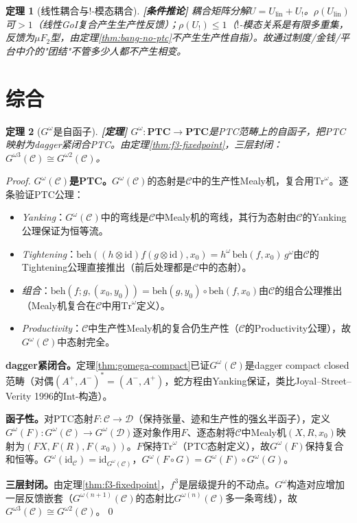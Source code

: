 \documentclass[11pt,a4paper]{article}
\newtheorem{theorem}{定理}
\newcommand{\lvl}[1]{\hfill\textbf{\footnotesize[#1]}}
\newcommand{\lvP}{\lvl{定理}}
\newcommand{\lvC}{\lvl{条件推论}}
\newcommand{\bang}{{!}}
\begin{document}
\begin{theorem}[线性耦合与$\bang$-模态耦合]\label{thm:coupling-quality}\lvC
耦合矩阵分解$U=U_{\mathrm{lin}}+U_{\bang}$。$\rho(U_{\mathrm{lin}})$可$>1$（线性GoI复合产生生产性反馈）；$\rho(U_{\bang})\leq 1$（$\bang$-模态关系是有限多重集，反馈为$\mu F_2$型，由定理\ref{thm:bang-no-ptc}不产生生产性自指）。故通过制度/金钱/平台中介的"团结"不管多少人都不产生相变。
\end{theorem}

\section{综合}

\begin{theorem}[$G^\omega$是自函子]\label{thm:gomega-endofunctor}\lvP
$G^\omega:\mathbf{PTC}\to\mathbf{PTC}$是PTC范畴上的自函子，把PTC映射为dagger紧闭合PTC。由定理\ref{thm:f3-fixedpoint}，三层封闭：$G^{\omega 3}(\mathcal{C})\cong G^{\omega 2}(\mathcal{C})$。
\end{theorem}

\begin{proof}
\textbf{$G^\omega(\mathcal{C})$是PTC。}$G^\omega(\mathcal{C})$的态射是$\mathcal{C}$中的生产性Mealy机，复合用$\mathrm{Tr}^\omega$。逐条验证PTC公理：
\begin{itemize}
  \item \emph{Yanking}：$G^\omega(\mathcal{C})$中的弯线是$\mathcal{C}$中Mealy机的弯线，其行为态射由$\mathcal{C}$的Yanking公理保证为恒等流。
  \item \emph{Tightening}：$\mathrm{beh}((h\otimes\mathrm{id})f(g\otimes\mathrm{id}),x_0)=h^\omega\,\mathrm{beh}(f,x_0)\,g^\omega$由$\mathcal{C}$的Tightening公理直接推出（前后处理都是$\mathcal{C}$中的态射）。
  \item \emph{组合}：$\mathrm{beh}(f;g,(x_0,y_0))=\mathrm{beh}(g,y_0)\circ\mathrm{beh}(f,x_0)$由$\mathcal{C}$的组合公理推出（Mealy机复合在$\mathcal{C}$中用$\mathrm{Tr}^\omega$定义）。
  \item \emph{Productivity}：$\mathcal{C}$中生产性Mealy机的复合仍生产性（$\mathcal{C}$的Productivity公理），故$G^\omega(\mathcal{C})$中态射完全。
\end{itemize}

\textbf{dagger紧闭合。}定理\ref{thm:gomega-compact}已证$G^\omega(\mathcal{C})$是dagger compact closed范畴（对偶$(A^+,A^-)^*=(A^-,A^+)$，蛇方程由Yanking保证，类比Joyal--Street--Verity 1996的Int-构造）。

\textbf{函子性。}对PTC态射$F:\mathcal{C}\to\mathcal{D}$（保持张量、迹和生产性的强幺半函子），定义$G^\omega(F):G^\omega(\mathcal{C})\to G^\omega(\mathcal{D})$逐对象作用$F$、逐态射将$\mathcal{C}$中Mealy机$(X,R,x_0)$映射为$(FX,F(R),F(x_0))$。$F$保持$\mathrm{Tr}^\omega$（PTC态射定义），故$G^\omega(F)$保持复合和恒等。$G^\omega(\mathrm{id}_\mathcal{C})=\mathrm{id}_{G^\omega(\mathcal{C})}$，$G^\omega(F\circ G)=G^\omega(F)\circ G^\omega(G)$。

\textbf{三层封闭。}由定理\ref{thm:f3-fixedpoint}，$f^3$是层级提升的不动点。$G^\omega$构造对应增加一层反馈嵌套（$G^{\omega(n+1)}(\mathcal{C})$的态射比$G^{\omega(n)}(\mathcal{C})$多一条弯线），故$G^{\omega 3}(\mathcal{C})\cong G^{\omega 2}(\mathcal{C})$。\qed
\end{proof}
\end{document}
